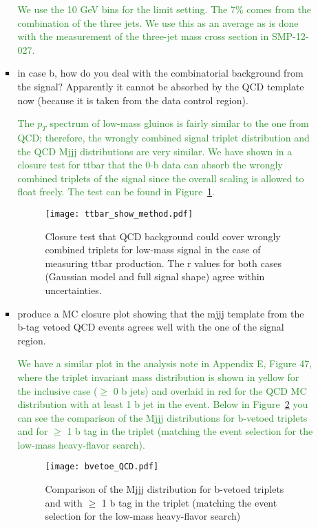 \documentclass[paper=a4, fontsize=11pt]{scrartcl}
\begin{document}
\begin{itemize}
\begin{itemize}
\begin{itemize}
\textcolor{ForestGreen}{We use the 10 GeV bins for the limit setting. The 7\% comes from the combination of the three jets. We use this as an average as is done with the measurement of the three-jet mass cross section in SMP-12-027.}\\

\item in case b, how do you deal with the combinatorial background from the signal? Apparently it cannot be absorbed by the QCD template now (because it is taken from the data control region). 

\textcolor{ForestGreen}{The $p_T$ spectrum of low-mass gluinos is fairly similar to the one from QCD; therefore, the wrongly combined signal triplet distribution  and the QCD Mjjj distributions are very similar. We have shown 
in a closure test for ttbar that the 0-b data can absorb the wrongly combined triplets of the signal since the overall scaling is allowed to float freely. The test can be found in Figure~\ref{fig:ttbar}.}\\
\begin{figure}[ht]
 \begin{center}
 \texttt{[image: ttbar\_show\_method.pdf]}
         \caption{Closure test that QCD background could cover wrongly combined  triplets for low-mass signal in the case of measuring ttbar production.
         The r values for both cases (Gaussian model and full signal shape) agree within uncertainties.}
   \label{fig:ttbar}
 \end{center}
\end{figure}
\item produce a MC closure plot showing that the mjjj template from the b-tag vetoed QCD events agrees well with the one of the signal region.

\textcolor{ForestGreen}{We have a similar plot in the analysis note in Appendix E, Figure 47, where the triplet invariant mass distribution is shown in yellow for the inclusive case ($\geq$ 0 b jets) and overlaid in red 
for the QCD MC distribution with at least 1 b jet in the event. Below in Figure~\ref{fig:bvetoe} you can see the comparison of the Mjjj distributions for b-vetoed triplets and for $\geq$ 1 b tag in the triplet (matching the event selection for the low-mass heavy-flavor search).}\\


\begin{figure}[ht]
 \begin{center}
 \texttt{[image: bvetoe\_QCD.pdf]}
         \caption{Comparison of the Mjjj distribution for b-vetoed triplets and with $\geq$ 1 b tag in the triplet (matching the event selection for the low-mass heavy-flavor search)}
   \label{fig:bvetoe}
 \end{center}
\end{figure}


\end{itemize}
\end{itemize}
\end{itemize}
\end{document}
